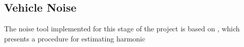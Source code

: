 \subsection{Vehicle Noise}

The noise tool implemented for this stage of the project is based on \cite{Brown2018}, which presents a procedure for estimating harmonic

